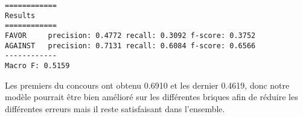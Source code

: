 \begin{verbatim}
============
Results
============
FAVOR     precision: 0.4772 recall: 0.3092 f-score: 0.3752
AGAINST   precision: 0.7131 recall: 0.6084 f-score: 0.6566
------------
Macro F: 0.5159
\end{verbatim}

\par Les premiers du concours ont obtenu 0.6910 et les dernier 0.4619, donc notre modèle pourrait être bien amélioré sur les différentes briques afin de réduire les différentes erreurs mais il reste satisfaisant dans l'ensemble. 